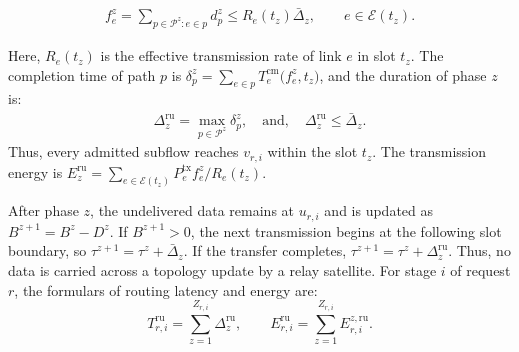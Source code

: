 \documentclass[10pt, conference, letterpaper]{IEEEtran}
\begin{document}
\begin{align}
f_e^z = {\sum}_{p \in \mathcal{P}^z : e \in p}d_p^z
\leq R_e(t_z)\bar{\Delta}_z,
\qquad e\in\mathcal{E}(t_z).
\label{eq:link_load_model}
\end{align}

Here, $R_e(t_z)$ is the effective transmission rate of link $e$ in slot $t_z$. The completion time of path $p$ is $\delta_p^z ={\sum}_{e\in p}T_e^{\text{cm}}\big(f_e^z,t_z\big)$, and the duration of phase $z$ is:
\begin{align}
\Delta_z^{\text{ru}} = {\max}_{p \in \mathcal{P}^{z}}\delta_p^z,\quad \text{and},\quad
\Delta_z^{\text{ru}}\leq \bar{\Delta}_z.
\label{eq:parallel_phase_delay_model}
\end{align}
Thus, every admitted subflow reaches $v_{r,i}$ within the slot $t_z$. The transmission energy is $ E_z^{\text{ru}} = \sum_{e\in\mathcal{E}(t_z)} P_e^{\text{tx}}{f_e^z}/{R_e(t_z)}$.

After phase $z$, the undelivered data remains at $u_{r,i}$ and is updated as $B^{z+1}=B^z-D^z$.
If $B^{z+1}>0$, the next transmission begins at the following slot boundary, so ${\tau}^{z+1}={\tau}^{z}+ \bar{\Delta}_z$. If the transfer completes, ${\tau}^{z+1}={\tau}^{z}+ {\Delta}^{\text{ru}}_z$.
Thus, no data is carried across a topology update by a relay satellite.
For stage $i$ of request $r$, the formulars of routing latency and energy are:
\begin{equation}
T_{r,i}^{\text{ru}}={\sum}_{z=1}^{Z_{r,i}}\Delta_z^{\text{ru}},\qquad
E_{r,i}^{\text{ru}}={\sum}_{z=1}^{Z_{r,i}}E_{r,i}^{z,\text{ru}}.
\label{eq:cross_slot_routing_cost_model}
\end{equation}
\end{document}
